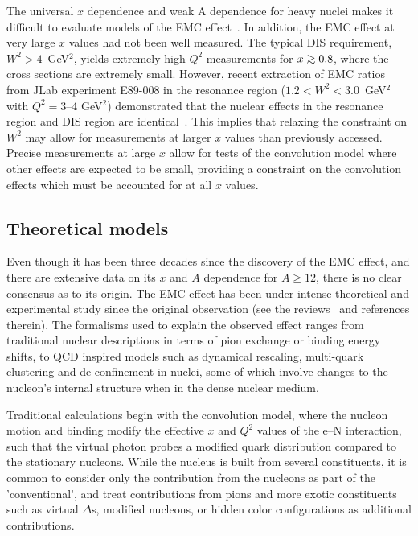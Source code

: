 The universal $x$ dependence and weak A dependence for heavy nuclei makes
it difficult to evaluate models of the EMC effect~\cite{geesaman95,
Norton_emcreview, sargsian03}.  In addition, the EMC effect at very large $x$
values had not been well measured. The typical DIS requirement, $W^2 >
4$~GeV$^2$, yields extremely high $Q^2$ measurements for $x \gtorder 0.8$,
where the cross sections are extremely small. However, recent extraction of
EMC ratios from JLab experiment E89-008 in the resonance region
($1.2<W^2<3.0$~GeV$^2$ with $Q^2 = 3$--4 GeV$^2$) demonstrated that the
nuclear effects in the resonance region and DIS region are
identical~\cite{Arrington:2003nt}. This implies that relaxing the constraint
on $W^2$ may allow for measurements at larger $x$ values than previously
accessed.  Precise measurements at large $x$ allow for tests of the
convolution model where other effects are expected to be small, providing a
constraint on the convolution effects which must be accounted for at all $x$
values.


\subsection{Theoretical models}\label{theory.ssec}

Even though it has been three decades since the discovery of the EMC effect,
and there are extensive data on its $x$ and $A$ dependence for $A \ge 12$,
there is no clear consensus as to its origin. The EMC effect has been under
intense theoretical and experimental study since the original observation (see
the reviews~\cite{geesaman95, Norton_emcreview, sargsian03} and references
therein). The formalisms used to explain the observed effect ranges from
traditional nuclear descriptions in terms of pion exchange or binding energy
shifts, to QCD inspired models such as dynamical rescaling, multi-quark
clustering and de-confinement in nuclei, some of which involve changes to
the nucleon's internal structure when in the dense nuclear medium.



Traditional calculations begin with the convolution model, where the nucleon
motion and binding modify the effective $x$ and $Q^2$ values of the e--N
interaction, such that the virtual photon probes a modified quark
distribution compared to the stationary nucleons.  While the nucleus is built
from several constituents, it is common to consider only the contribution from
the nucleons as part of the 'conventional', and treat contributions from pions
and more exotic constituents such as virtual $\Delta$s, modified nucleons, or
hidden color configurations as additional contributions.

